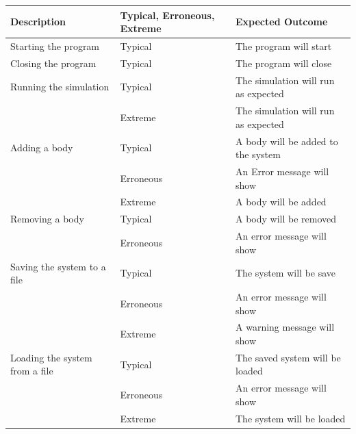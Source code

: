 \begin{tabular}{p{}p{}p{}} 
	Description & Typical, Erroneous, Extreme & Expected Outcome \\ \hline
	Starting the program & Typical & The program will start \\ 
	Closing the program & Typical & The program will close \\
	Running the simulation & Typical & The simulation will run as expected
	\\
	 & Extreme & The simulation will run as expected \\
	Adding a body & Typical & A body will be added to the system \\
	 & Erroneous & An Error message will show \\
	 & Extreme & A body will be added \\
	Removing a body & Typical & A body will be removed \\
	 & Erroneous & An error message will show \\
	Saving the system to a file & Typical & The system will be save \\
	 & Erroneous & An error message will show \\
	 & Extreme & A warning message will show \\
	Loading the system from a file & Typical & The saved system will be
	loaded \\
	 & Erroneous & An error message will show \\
	 & Extreme & The system will be loaded \\
		
\end{tabular}
